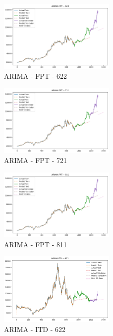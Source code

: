 \documentclass{ieeeojies}
\begin{document}
\begin{figure} [H]
    \centering
    \includegraphics[width=0.5\textwidth]{bibliography/Figure/ARIMA_FPT_622_90.png}
    \caption{ARIMA - FPT - 622}
    \label{fig:ARIMA_FPT_622_90}
\end{figure}
\begin{figure} [H]
    \centering
    \includegraphics[width=0.5\textwidth]{bibliography/Figure/ARIMA_FPT_721_90.png}
    \caption{ARIMA - FPT - 721}
    \label{fig:ARIMA_FPT_721_90}
\end{figure}
\begin{figure} [H]
    \centering
    \includegraphics[width=0.5\textwidth]{bibliography/Figure/ARIMA_FPT_811_90.png}
    \caption{ARIMA - FPT - 811}
    \label{fig:ARIMA_FPT_811_90}
\end{figure}
\begin{figure} [H]
    \centering
    \includegraphics[width=0.5\textwidth]{bibliography/Figure/ARIMA_ITD_622_90.png}
    \caption{ARIMA - ITD - 622}
    \label{fig:ARIMA_ITD_622_90}
\end{figure}
\end{document}
